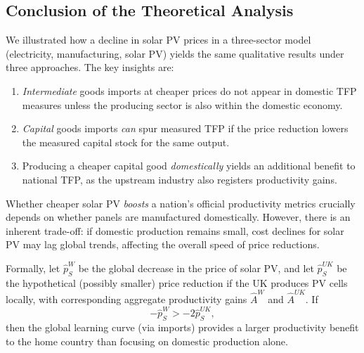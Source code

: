 \documentclass[11pt]{article}
\begin{document}
\subsection{Conclusion of the Theoretical Analysis}
We illustrated how a decline in solar PV prices in a three-sector model (electricity, 
manufacturing, solar PV) yields the same qualitative results under three approaches. The key insights are:
\begin{enumerate}
    \item \emph{Intermediate} goods imports at cheaper prices do not appear in domestic TFP measures unless the producing sector is also within the domestic economy.
    \item \emph{Capital} goods imports \emph{can} spur measured TFP if the price reduction lowers the measured capital stock for the same output.
    \item Producing a cheaper capital good \emph{domestically} yields an additional benefit to national TFP, as the upstream industry also registers productivity gains.
\end{enumerate}

Whether cheaper solar PV \emph{boosts} a nation's official productivity metrics crucially depends on whether panels are manufactured domestically. However, there is an inherent trade-off: if domestic production remains small, cost declines for solar PV may lag global trends, affecting the overall speed of price reductions.

Formally, let $\hat{p}_S^W$ be the global decrease in the price of solar PV, and let $\hat{p}_S^{UK}$ be the hypothetical (possibly smaller) price reduction if the UK produces PV cells locally, with corresponding aggregate productivity gains $\hat{A}^{W}$ and $\hat{A}^{UK}$. If
\[
-\hat{p}_{S}^W  >  -2 \hat{p}_{S}^{UK},
\]
then the global learning curve (via imports) provides a larger productivity benefit to the home country than focusing on domestic production alone.


\small
\renewcommand\bibname{References}


\normalsize
\end{document}
